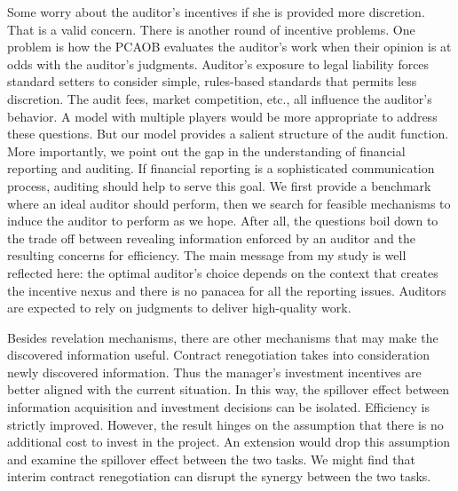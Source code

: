 Some worry about the auditor's incentives if she is provided more
discretion. That is a valid concern. There is another round of
incentive problems. One problem is how the PCAOB evaluates the
auditor's work when their opinion is at odds with the auditor's
judgments. Auditor's exposure to legal liability forces standard
setters to consider simple, rules-based standards that permits less
discretion. The audit fees, market competition, etc., all influence
the auditor's behavior. A model with multiple players would be more
appropriate to address these questions. But our model provides a
salient structure of the audit function. More importantly, we point
out the gap in the understanding of financial reporting and
auditing. If financial reporting is a sophisticated communication
process, auditing should help to serve this goal. We first provide a
benchmark where an ideal auditor should perform, then we search for
feasible mechanisms to induce the auditor to perform as we hope.
After all, the questions boil down to the trade off between
revealing information enforced by an auditor and the resulting
concerns for efficiency. The main message from my study is well
reflected here: the optimal auditor's choice depends on the context
that creates the incentive nexus and there is no panacea for all the
reporting issues. Auditors are expected to rely on judgments to
deliver high-quality work.

Besides revelation mechanisms, there are other mechanisms that may
make the discovered information useful. Contract renegotiation takes
into consideration newly discovered information. Thus the manager's
investment incentives are better aligned with the current situation.
In this way, the spillover effect between information acquisition
and investment decisions can be isolated. Efficiency is strictly
improved. However, the result hinges on the assumption that there is
no additional cost to invest in the project. An extension would drop
this assumption and examine the spillover effect between the two
tasks. We might find that interim contract renegotiation can disrupt
the synergy between the two tasks.
